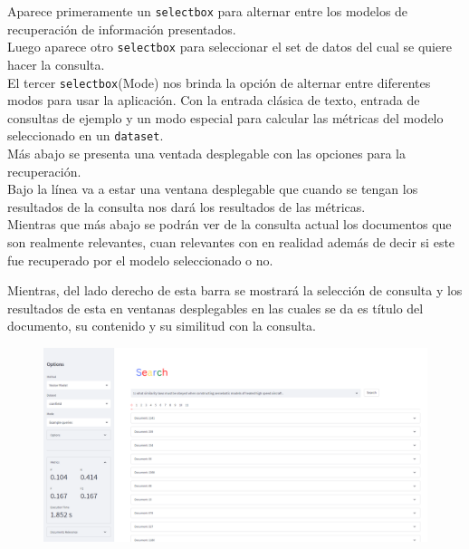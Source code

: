 \documentclass[spanish]{article}
\begin{document}
\begin{multicols}{2}
		Aparece primeramente un \texttt{selectbox} para alternar entre los modelos de recuperación de información presentados.\\

		Luego aparece otro \texttt{selectbox} para seleccionar el set de datos del cual se quiere hacer la consulta.\\

		El tercer \texttt{selectbox}(Mode) nos brinda la opción de alternar entre diferentes modos para usar la aplicación. Con la entrada clásica de texto, entrada de consultas de ejemplo y un modo especial para calcular las métricas del modelo seleccionado en un \texttt{dataset}. \\

		Más abajo se presenta una ventada desplegable con las opciones para la recuperación.\\

		Bajo la línea va a estar una ventana desplegable que cuando se tengan los resultados de la consulta nos dará los resultados de las métricas.\\

		Mientras que más abajo se podrán ver de la consulta actual los documentos que son realmente relevantes, cuan relevantes con en realidad además de decir si este fue recuperado por el modelo seleccionado o no.\\
	\end{multicols}
		
		

		Mientras, del lado derecho de esta barra se mostrará la selección de consulta y los resultados de esta en ventanas desplegables en las cuales se da es título del documento, su contenido y su similitud con la consulta.

		\begin{figure}[H]
			\includegraphics[scale=0.38]{fullscreen.png}
		\end{figure}
		
\end{document}
